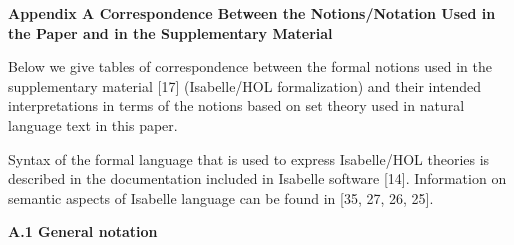 \documentclass[10pt,a4paper]{amsart}
\begin{document}
 
 
 

 
\par\medskip\noindent\textbf{Appendix A Correspondence Between the Notions/Notation Used in the Paper and in the Supplementary Material}\par
 
 
Below we give tables of correspondence between the formal notions used in the supplementary material [17] (Isabelle/HOL formalization) and their intended interpretations in terms of the notions based on set theory used in natural language text in this paper.\par
 
 
 
Syntax of the formal language that is used to express Isabelle/HOL theories is described in the documentation included in Isabelle software [14]. Information on semantic aspects of Isabelle language can be found in [35, 27, 26, 25].\par
 
 
 
\par\medskip\noindent\textbf{A.1 General notation}\par
 
 
\end{document}
